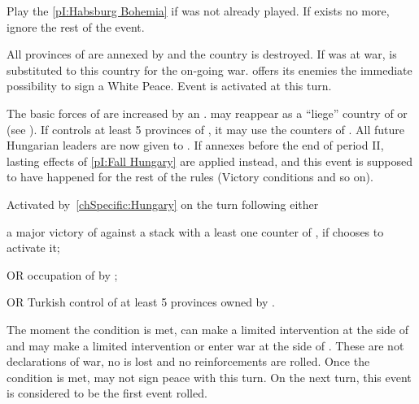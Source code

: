 \condition{}
\aparag Play the \ref{pI:Habsburg Bohemia} if was not already played.
\aparag If \paysHongrie exists no more, ignore the rest of the event.

\phevnt
\aparag All provinces of \paysHongrie are annexed by \HAB and the country is
destroyed.
\aparag If \paysHongrie was at war, \HAB is substituted to this country for
the on-going war. \HAB offers its enemies the immediate possibility to sign a
White Peace.
\aparag Event  is activated at this turn.

\effetlong
\aparag The basic forces of \HAB are increased by an \ARMY\faceplus.
\aparag \paysHongrie may reappear as a ``liege'' country of \HAB or \SPA (see
).
\aparag If \HAB controls at least 5 provinces of \paysHongrie, it may use the
counters of \paysHongrie.
\aparag All future Hungarian leaders are now given to \HAB.
\aparag If \TUR annexes \villeBuda before the end of period II, lasting
effects of \ref{pI:Fall Hungary} are applied instead, and this event is
supposed to have happened for the rest of the rules (Victory conditions and so
on).





\activation{}
\aparag Activated by~\ref{chSpecific:Hungary} on the turn following either
\begin{modlist}
\item a major victory of \TUR against a stack with a least one \ARMY counter
  of \paysHongrie, if \TUR chooses to activate it;
\item[OR] occupation of \villeBuda by \TUR;
\item[OR] Turkish control of at least 5 provinces owned by \paysHongrie.
\end{modlist}
\bparag The moment the condition is met, \POL can make a limited intervention
at the side of \paysHongrie and \HAB may make a limited intervention or enter
war at the side of \paysHongrie. These are not declarations of war, no \STAB
is lost and no reinforcements are rolled.
\bparag Once the condition is met, \TUR may not sign peace with \paysHongrie
this turn.
\bparag On the next turn, this event is considered to be the first event
rolled.


